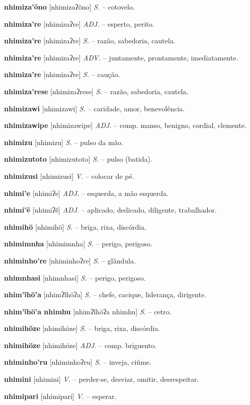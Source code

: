 \textbf{nhimiza'õno} [nhimizaʔõno] \textit{S.} -- cotovelo.

\textbf{nhimiza're} [nhimizaʔre] \textit{ADJ.} -- esperto, perito.

\textbf{nhimiza're} [nhimizaʔre] \textit{S.} -- razão, sabedoria, cautela.

\textbf{nhimiza're} [nhimizaʔre] \textit{ADV.} -- juntamente, prontamente, imediatamente.

\textbf{nhimiza're} [nhimizaʔre] \textit{S.} -- caução.

\textbf{nhimiza'rese} [nhimizaʔrese] \textit{S.} -- razão, sabedoria, cautela.

\textbf{nhimizawi} [nhimizawi] \textit{S.} -- caridade, amor, benevolência.

\textbf{nhimizawipe} [nhimizawipe] \textit{ADJ.} -- comp. manso, benigno, cordial, clemente.

\textbf{nhimizu} [nhimizu] \textit{S.} -- pulso da mão.

\textbf{nhimizutoto} [nhimizutoto] \textit{S.} -- pulso (batida).

\textbf{nhimizusi} [nhimizusi] \textit{V.} -- colocar de pé.

\textbf{nhimi'e} [nhimiʔe] \textit{ADJ.} -- esquerda, a mão esquerda.

\textbf{nhimi'ẽ} [nhimiʔẽ] \textit{ADJ.} -- aplicado, dedicado, diligente, trabalhador.

\textbf{nhimihö} [nhimihö] \textit{S.} -- briga, rixa, discórdia.

\textbf{nhimimnha} [nhimimnha] \textit{S.} -- perigo, perigoso.

\textbf{nhiminho're} [nhiminhoʔre] \textit{S.} -- glândula.

\textbf{nhimnhasi} [nhimnhasi] \textit{S.} -- perigo, perigoso.

\textbf{nhim'ĩhö'a} [nhimʔĩhöʔa] \textit{S.} -- chefe, cacique, liderança, dirigente.

\textbf{nhim'ĩhö'a nhimhu} [nhimʔĩhöʔa nhimhu] \textit{S.} -- cetro.

\textbf{nhimihöze} [nhimihöze] \textit{S.} -- briga, rixa, discórdia.

\textbf{nhimihöze} [nhimihöze] \textit{ADJ.} -- comp. briguento.

\textbf{nhiminho'ru} [nhiminhoʔru] \textit{S.} -- inveja, ciúme.

\textbf{nhimini} [nhimini] \textit{V.} -- perder-se, desviar, omitir, desrespeitar.

\textbf{nhimipari} [nhimipari] \textit{V.} -- esperar.

